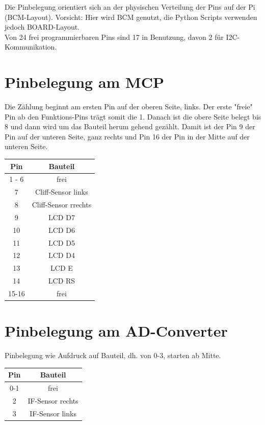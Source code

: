 \documentclass[twoside,11pt, a4paper]{report}
\begin{document}
	Die Pinbelegung orientiert sich an der physischen Verteilung der Pins auf der Pi (BCM-Layout). Vorsicht: Hier wird BCM genutzt, die Python Scripts verwenden jedoch BOARD-Layout. \\
	Von 24 frei programmierbaren Pins sind 17 in Benutzung, davon 2 für I2C-Kommunikation. 
	
	\section{Pinbelegung am MCP}
	Die Zählung beginnt am ersten Pin auf der oberen Seite, links. Der erste "freie" Pin ab den Funktions-Pins trägt somit die 1. Danach ist die obere Seite belegt bis 8 und dann wird um das Bauteil herum gehend gezählt. Damit ist der Pin 9 der Pin auf der unteren Seite, ganz rechts und Pin 16 der Pin in der Mitte auf der unteren Seite. 
	
	\begin{center}
		\begin{tabular}{|c|c|}
			\hline
			Pin 	& Bauteil\\
			\hline
			1 - 6		&  frei\\
			7		& Cliff-Sensor links\\
			8		& Cliff-Sensor rrechts\\
			9		& LCD D7		\\
			10		& LCD D6 	\\
			11		& LCD D5		\\
			12		& LCD D4	\\
			13		& LCD E	\\	
			14		& LCD RS	\\
			15-16		& 	frei\\
			\hline
		\end{tabular}
	\end{center}
	
	\section{Pinbelegung am AD-Converter}
	Pinbelegung wie Aufdruck auf Bauteil, dh. von 0-3, starten ab Mitte.
	
	\begin{center}
		\begin{tabular}{|c|c|}
			\hline
			Pin 	& Bauteil\\
			\hline
			0-1		& 	frei\\
			2 		& IF-Sensor rechts\\
			3		& IF-Sensor links\\
			\hline
		\end{tabular}
	\end{center}
	
\end{document}
